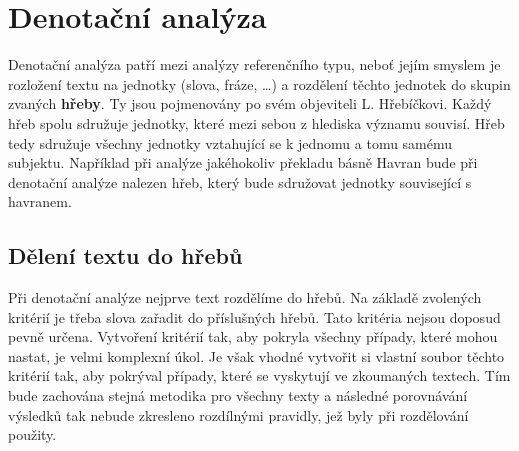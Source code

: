 \documentclass[dp.tex]{subfiles}
\begin{document}
\chapter{Denotační analýza}
\label{chap:denotacni_analyza}

Denotační analýza patří mezi analýzy referenčního typu, neboť jejím smyslem je rozložení textu na jednotky (slova, fráze, \ldots) a rozdělení těchto jednotek do skupin zvaných \textbf{hřeby}. Ty jsou pojmenovány po svém objeviteli L. Hřebíčkovi. Každý hřeb spolu sdružuje jednotky, které mezi sebou z hlediska významu souvisí. Hřeb tedy sdružuje všechny jednotky vztahující se k jednomu a tomu samému subjektu. Například při analýze jakéhokoliv překladu básně Havran bude při denotační analýze nalezen hřeb, který bude sdružovat jednotky související s havranem.

\section{Dělení textu do hřebů}

Při denotační analýze nejprve text rozdělíme do hřebů. Na základě zvolených kritérií je třeba slova zařadit do příslušných hřebů. Tato kritéria nejsou doposud pevně určena. Vytvoření kritérií tak, aby pokryla všechny případy, které mohou nastat, je velmi komplexní úkol. Je však vhodné vytvořit si vlastní soubor těchto kritérií tak, aby pokrýval případy, které se vyskytují ve zkoumaných textech. Tím bude zachována stejná metodika pro všechny texty a následné porovnávání výsledků tak nebude zkresleno rozdílnými pravidly, jež byly při rozdělování použity.
\end{document}
